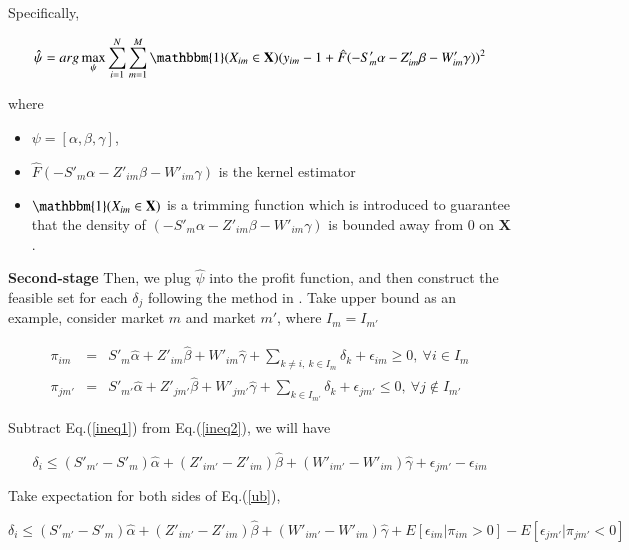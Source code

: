 \documentclass[a4paper]{article}
\begin{document}
Specifically, 

$$\hat{\psi}=arg \max_\psi \sum_{i=1}^N \sum_{m=1}^M \mathbbm{1}(X_{im} \in \textbf{X}) (y_{im} - 1 + \hat{F}( - S'_m\alpha - Z'_{im}\beta - W'_{im}\gamma))^2$$

where 

\begin{itemize}
\item $\psi=[\alpha, \beta, \gamma]$, 
\item $\hat{F}( - S'_m\alpha - Z'_{im}\beta - W'_{im}\gamma)$ is the kernel estimator 
\item $ \mathbbm{1}(X_{im} \in \textbf{X})$ is a trimming function which is introduced to guarantee that the density of $(- S'_m\alpha - Z'_{im}\beta - W'_{im}\gamma)$ is bounded away from 0 on $\textbf{X}$.
\end{itemize}


\bigskip

\textbf{Second-stage}  Then, we plug $\hat{\psi}$ into the profit function, and then construct the feasible set for each $\delta_j$ following the method in \cite{pakes2015moment}. Take upper bound as an example, consider market $m$ and market $m'$, where $I_m=I_{m'}$

\begin{eqnarray}
\label{ineq1}
 \pi_{im} &=& S'_m\hat{\alpha}+Z'_{im}\hat{\beta}+W'_{im}\hat{\gamma}+\sum_{k\neq i,\ k \in I_m}\delta_{k}+\epsilon_{im} \geq 0, \ \forall i \in I_{m}  \\ 
\label{ineq2}
 \pi_{jm'} &=& S'_{m'}\hat{\alpha}+Z'_{jm'}\hat{\beta}+W'_{jm'}\hat{\gamma}+\sum_{k \in I_{m'}}\delta_{k}+\epsilon_{jm'} \leq 0, \ \forall j \not\in I_{m'}  
\end{eqnarray}

Subtract Eq.(\ref{ineq1}) from Eq.(\ref{ineq2}), we will have

\begin{equation}
\delta_i \leq (S'_{m'}-S'_m)\hat{\alpha}+(Z'_{im'}-Z'_{im})\hat{\beta}+(W'_{im'}-W'_{im})\hat{\gamma}+\epsilon_{jm'}-\epsilon_{im} 
\label{ub}
\end{equation}

Take expectation for both sides of Eq.(\ref{ub}), 

\begin{equation}
\delta_i \leq (S'_{m'}-S'_m)\hat{\alpha}+(Z'_{im'}-Z'_{im})\hat{\beta}+(W'_{im'}-W'_{im})\hat{\gamma}+E[\epsilon_{im} | \pi_{im} > 0 ]-E[\epsilon_{jm'} | \pi_{jm'} < 0 ] 
\label{ub_exp}
\end{equation}
\end{document}
